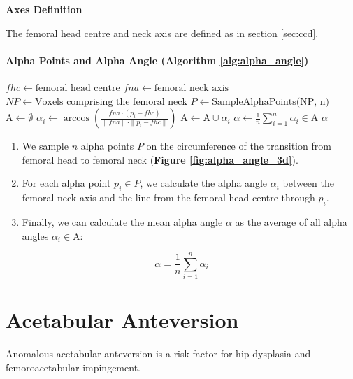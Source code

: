 \documentclass[a4paper,12pt]{article}
\newcommand{\subheading}[1]{\bigskip \large \noindent \textbf{#1}\bigskip \normalsize}
\begin{document}
	\subheading{Axes Definition}

	\noindent The femoral head centre and neck axis are defined as in section \ref{sec:ccd}.

	\paragraph{Alpha Points and Alpha Angle (Algorithm \ref{alg:alpha_angle})}

	\begin{algorithm}[H]
		\caption{Alpha Angle Calculation}
		\label{alg:alpha_angle}
		\begin{algorithmic}[1]
				\State $fhc \gets \text{femoral head centre}$
				\State $fna \gets \text{femoral neck axis}$
				\State $NP \gets \text{Voxels comprising the femoral neck}$
				\State $P \gets \text{SampleAlphaPoints(NP, n)}$
				\State $\mathrm{A} \gets \emptyset$
					\State $\alpha_i \gets \arccos\left(\frac{fna \cdot (p_i - fhc)}{\|fna\| \cdot \|p_i - fhc\|}\right)$
					\State $\mathrm{A} \gets \mathrm{A} \cup \alpha_i$
				\EndFor
				\State $\alpha \gets \frac{1}{n} \sum_{i=1}^{n} \alpha_i \in \mathrm{A}$
				\State \Return $\alpha$
			\EndProcedure
		\end{algorithmic}
	\end{algorithm}

	\begin{enumerate}
		\item We sample $n$ alpha points $P$ on the circumference of the transition from femoral head to femoral neck (\textbf{Figure \ref{fig:alpha_angle_3d}}).
		\item For each alpha point $p_i \in P$, we calculate the alpha angle $\alpha_i$ between the femoral neck axis and the line from the femoral head centre through $p_i$.
		\item Finally, we can calculate the mean alpha angle $\bar{\alpha}$ as the average of all alpha angles $\alpha_i \in \mathrm{A}$:
	\end{enumerate}

	\[
		\alpha = \frac{1}{n} \sum_{i=1}^{n} \alpha_i
	\]

	\section{Acetabular Anteversion}
	\label{sec:acetabular_anteversion}
	Anomalous acetabular anteversion is a risk factor for hip dysplasia and femoroacetabular impingement.
\end{document}
